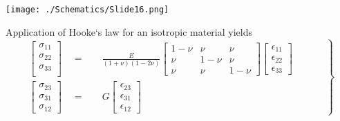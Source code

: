 \begin{Figure}
 \centering
 \texttt{[image: ./Schematics/Slide16.png]}
 \vspace{-0.5cm}
 \label{fig:beamCS}
\end{Figure}
\vspace{0.5cm}
Application of Hooke`s law for an isotropic material yields
\begin{equation}
\label{eqn:HookesLaw1}
\left.
\begin{aligned}
\begin{bmatrix}
\sigma_{11} \\ 
\sigma_{22} \\
\sigma_{33} \\
\end{bmatrix} \quad = & \quad 
\frac{E}{(1+\nu)(1-2\nu)}
\begin{bmatrix}
1 - \nu & \nu & \nu \\
\nu & 1 - \nu & \nu \\
\nu & \nu & 1 - \nu 
\end{bmatrix}
\begin{bmatrix}
\epsilon_{11} \\ \epsilon_{22} \\ \epsilon_{33} \end{bmatrix} \qquad \quad \\
\begin{bmatrix} \sigma_{23} \\ \sigma_{31} \\ \sigma_{12} \end{bmatrix} \quad = & \quad 
G \begin{bmatrix}
\epsilon_{23} \\ \epsilon_{31} \\ \epsilon_{12} \end{bmatrix} \qquad \quad
\end{aligned}
\right\}
\end{equation}

